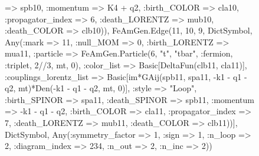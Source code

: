 \documentclass{revtex4}
\begin{document}
\begin{figure}[!htb]
\begin{center}
{=> spb10, :momentum => K4 + q2, :birth_COLOR => cla10, :propagator_index => 6, :death_LORENTZ => mub10, :death_COLOR => clb10)), FeAmGen.Edge(11, 10, 9, Dict{Symbol, Any}(:mark => 11, :null_MOM => 0, :birth_LORENTZ => mua11, :particle => FeAmGen.Particle(6, "t", "tbar", :fermion, :triplet, 2//3, mt, 0), :color_list => Basic[DeltaFun(clb11, cla11)], :couplings_lorentz_list => Basic[im*GAij(spb11, spa11, -k1 - q1 - q2, mt)*Den(-k1 - q1 - q2, mt, 0)], :style => "Loop", :birth_SPINOR => spa11, :death_SPINOR => spb11, :momentum => -k1 - q1 - q2, :birth_COLOR => cla11, :propagator_index => 7, :death_LORENTZ => mub11, :death_COLOR => clb11))], Dict{Symbol, Any}(:symmetry_factor => 1, :sign => 1, :n_loop => 2, :diagram_index => 234, :n_out => 2, :n_inc => 2)) 
}
\end{center}
\end{figure}
\end{document}

